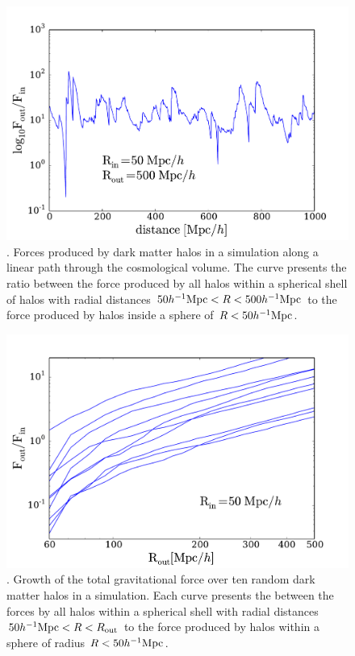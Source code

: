 \documentclass{article}
\newcommand{\hMpc}{{\ifmmode{h^{-1}{\rm Mpc}}\else{$h^{-1}$Mpc }\fi}}
\begin{document}
\begin{figure}
\begin{center}
\includegraphics[width=0.8\linewidth,angle=0]{trace_nbody_82_300_1000.pdf}
\caption{\label{fig:trace_nbody}. Forces produced by dark matter halos in a
simulation along a linear path through the cosmological volume. The
curve presents the ratio between the force produced by all halos
within a spherical shell of halos with radial distances $50\hMpc
<R<500\hMpc$ to the force produced by halos inside 
a sphere of $R<50\hMpc$. }
\end{center}
\end{figure}



\begin{figure}
\begin{center}
\includegraphics[width=0.8\linewidth,angle=0]{spheres_nbody_radius_82_300_1000.pdf}
\caption{\label{fig:spheres_radius}. Growth of the total gravitational
  force over ten random dark matter halos in a simulation. Each curve
  presents the between the forces by all halos within a spherical shell with
   radial distances $50\hMpc < R < R_{\rm out}$ to the force produced
   by halos within a sphere of radius $R<50\hMpc$. }  
\end{center}
\end{figure}
\end{document}
